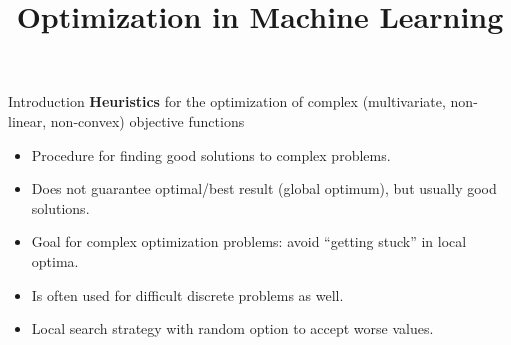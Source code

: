 \documentclass[11pt,compress,t,notes=noshow, xcolor=table]{beamer}
\title{Optimization in Machine Learning}
\begin{document}

\begin{vbframe}{Introduction}
\textbf{Heuristics} for the optimization of complex (multivariate, non-linear, non-convex) objective functions \\
\lz

\begin{itemize}
\item Procedure for finding good solutions to complex problems.
\item Does not guarantee optimal/best result (global optimum), but usually good solutions.
\item Goal for complex optimization problems: avoid \enquote{getting stuck} in local optima.
\item Is often used for difficult discrete problems as well.
\item Local search strategy with random option to accept worse values.
\end{itemize}

\end{vbframe}
\end{document}
